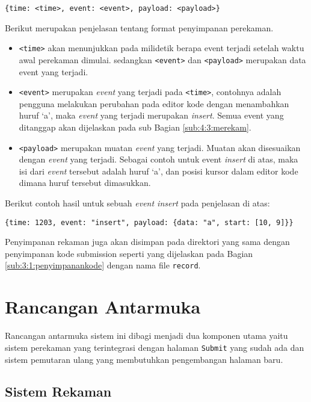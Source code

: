 \begin{center}
    \verb|{time: <time>, event: <event>, payload: <payload>}|
\end{center}

Berikut merupakan penjelasan tentang format penyimpanan perekaman.

\begin{itemize}
    \item \verb|<time>| akan menunjukkan pada milidetik berapa event terjadi setelah waktu awal perekaman dimulai. sedangkan \verb|<event>| dan \verb|<payload>| merupakan data event yang terjadi.

    \item \verb|<event>| merupakan \textit{event} yang terjadi pada \verb|<time>|, contohnya adalah pengguna melakukan perubahan pada editor kode dengan menambahkan huruf `a', maka \textit{event} yang terjadi merupakan \textit{insert}. Semua event yang ditanggap akan dijelaskan pada sub Bagian \ref{sub:4:3:merekam}.

    \item \verb|<payload>| merupakan muatan \textit{event} yang terjadi. Muatan akan disesuaikan dengan \textit{event} yang terjadi. Sebagai contoh untuk event \textit{insert} di atas, maka isi dari \textit{event} tersebut adalah huruf `a', dan posisi kursor dalam editor kode dimana huruf tersebut dimasukkan.
\end{itemize}

Berikut contoh hasil untuk sebuah \textit{event insert} pada penjelasan di atas:

\begin{center}
    \verb|{time: 1203, event: "insert", payload: {data: "a", start: [10, 9]}}|
\end{center}

Penyimpanan rekaman juga akan disimpan pada direktori yang sama dengan penyimpanan kode submission seperti yang dijelaskan pada Bagian \ref{sub:3:1:penyimpanankode} dengan nama file \verb|record|.


\section{Rancangan Antarmuka}

Rancangan antarmuka sistem ini dibagi menjadi dua komponen utama yaitu sistem perekaman yang terintegrasi dengan halaman \verb|Submit| yang sudah ada dan sistem pemutaran ulang yang membutuhkan pengembangan halaman baru.

\subsection{Sistem Rekaman}
\label{sub:4:1:rekaman}

